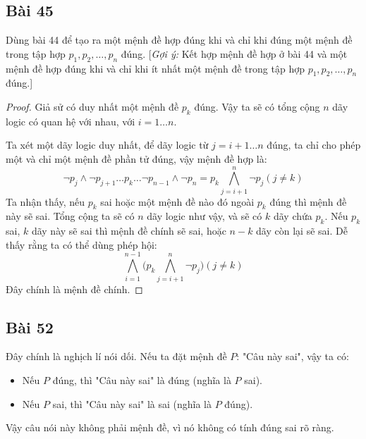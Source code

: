 \subsection*{Bài 45}
Dùng bài 44 để tạo ra một mệnh đề hợp đúng khi và chỉ khi đúng một mệnh đề trong tập hợp $p_1,p_2,\dots,p_n$ đúng. [\textit{Gợi ý:} Kết hợp mệnh đề hợp ở bài 44 và một mệnh đề hợp đúng khi và chỉ khi ít nhất một mệnh đề trong tập hợp $p_1,p_2,\dots,p_n$ đúng.]
\begin{proof}
    Giả sử có duy nhất một mệnh đề $p_k$ đúng. Vậy ta sẽ có tổng cộng $n$ dãy logic có quan hệ với nhau, với $i=1\dots n$.\\
    \par Ta xét một dãy logic duy nhất, để dãy logic từ $j=i+1\dots n$ đúng, ta chỉ cho phép một và chỉ một mệnh đề phần tử đúng, vậy mệnh đề hợp là: $$\neg p_j\land\neg p_{j+1}\dots p_k\dots \neg p_{n-1}\land\neg p_n=p_k\bigwedge_{j=i+1}^n \neg p_j (j\neq k)$$
    Ta nhận thấy, nếu $p_k$ sai hoặc một mệnh đề nào đó ngoài $p_k$ đúng thì mệnh đề này sẽ sai. Tổng cộng ta sẽ có $n$ dãy logic như vậy, và sẽ có $k$ dãy chứa $p_k$. Nếu $p_k$ sai, $k$ dãy này sẽ sai thì mệnh đề chính sẽ sai, hoặc $n-k$ dãy còn lại sẽ sai. Dễ thấy rằng ta có thể dùng phép hội:
    $$\bigwedge_{i=1}^{n-1}\bigg(p_k\bigwedge_{j=i+1}^n\neg p_j\bigg) (j\neq k)$$
    Đây chính là mệnh đề chính.
\end{proof}
\subsection*{Bài 52}
Đây chính là nghịch lí nói dối. Nếu ta đặt mệnh đề $P$: "Câu này sai", vậy ta có:
\begin{itemize}
    \item Nếu $P$ đúng, thì "Câu này sai" là đúng (nghĩa là $P$ sai).
    \item Nếu $P$ sai, thì "Câu này sai" là sai (nghĩa là $P$ đúng).
\end{itemize}
Vậy câu nói này không phải mệnh đề, vì nó không có tính đúng sai rõ ràng.
